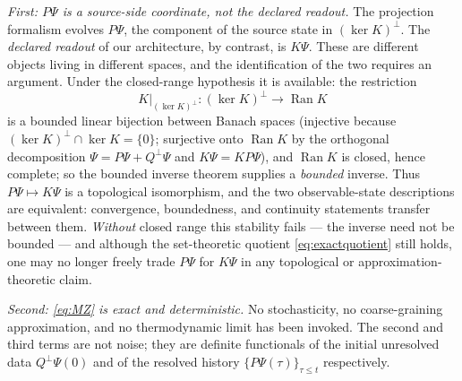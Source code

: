 \documentclass[11pt,reqno]{amsart}
\theoremstyle{plain}
\theoremstyle{definition}
\theoremstyle{remark}
\DeclareMathOperator{\Ran}{Ran}
\begin{document}
\emph{First: $P\Psi$ is a source-side coordinate, not the declared readout.} The projection formalism evolves $P\Psi$, the component of the source state in $(\ker K)^{\perp}$. The \emph{declared readout} of our architecture, by contrast, is $K\Psi$. These are different objects living in different spaces, and the identification of the two requires an argument. Under the closed-range hypothesis it is available: the restriction
\[
K|_{(\ker K)^{\perp}}\colon (\ker K)^{\perp}\longrightarrow \Ran K
\]
is a bounded linear bijection between Banach spaces (injective because $(\ker K)^{\perp}\cap\ker K=\{0\}$; surjective onto $\Ran K$ by the orthogonal decomposition $\Psi=P\Psi+Q^{\!\perp}\Psi$ and $K\Psi=KP\Psi$), and $\Ran K$ is closed, hence complete; so the bounded inverse theorem supplies a \emph{bounded} inverse. Thus $P\Psi\mapsto K\Psi$ is a topological isomorphism, and the two observable-state descriptions are equivalent: convergence, boundedness, and continuity statements transfer between them. \emph{Without} closed range this stability fails --- the inverse need not be bounded --- and although the set-theoretic quotient \eqref{eq:exactquotient} still holds, one may no longer freely trade $P\Psi$ for $K\Psi$ in any topological or approximation-theoretic claim.

\emph{Second: \eqref{eq:MZ} is exact and deterministic.} No stochasticity, no coarse-graining approximation, and no thermodynamic limit has been invoked. The second and third terms are not noise; they are definite functionals of the initial unresolved data $Q^{\!\perp}\Psi(0)$ and of the resolved history $\{P\Psi(\tau)\}_{\tau\le t}$ respectively.
\end{document}
